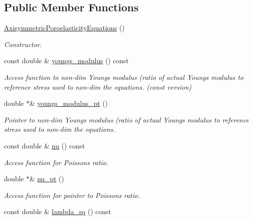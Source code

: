 \subsection*{Public Member Functions}
\begin{DoxyCompactItemize}
\item 
\hyperlink{classoomph_1_1AxisymmetricPoroelasticityEquations_a4dc47e5296f523f13d704194bd3b893f}{Axisymmetric\+Poroelasticity\+Equations} ()
\begin{DoxyCompactList}\small\item\em Constructor. \end{DoxyCompactList}\item 
const double \& \hyperlink{classoomph_1_1AxisymmetricPoroelasticityEquations_a2e3ac54472beffc980b88db8c071e114}{youngs\+\_\+modulus} () const
\begin{DoxyCompactList}\small\item\em Access function to non-\/dim Young\textquotesingle{}s modulus (ratio of actual Young\textquotesingle{}s modulus to reference stress used to non-\/dim the equations. (const version) \end{DoxyCompactList}\item 
double $\ast$\& \hyperlink{classoomph_1_1AxisymmetricPoroelasticityEquations_af6e08b6f974b94d715ec008cb2858966}{youngs\+\_\+modulus\+\_\+pt} ()
\begin{DoxyCompactList}\small\item\em Pointer to non-\/dim Young\textquotesingle{}s modulus (ratio of actual Young\textquotesingle{}s modulus to reference stress used to non-\/dim the equations. \end{DoxyCompactList}\item 
const double \& \hyperlink{classoomph_1_1AxisymmetricPoroelasticityEquations_ae031a1a1495cf6fa8b7988462b113d29}{nu} () const
\begin{DoxyCompactList}\small\item\em Access function for Poisson\textquotesingle{}s ratio. \end{DoxyCompactList}\item 
double $\ast$\& \hyperlink{classoomph_1_1AxisymmetricPoroelasticityEquations_a239f7f3be1cd9f42163f3d7f1bb87da8}{nu\+\_\+pt} ()
\begin{DoxyCompactList}\small\item\em Access function for pointer to Poisson\textquotesingle{}s ratio. \end{DoxyCompactList}\item 
const double \& \hyperlink{classoomph_1_1AxisymmetricPoroelasticityEquations_a9f1697a47ba5a34054b5820f2766f8f7}{lambda\+\_\+sq} () const

\end{DoxyCompactItemize}
